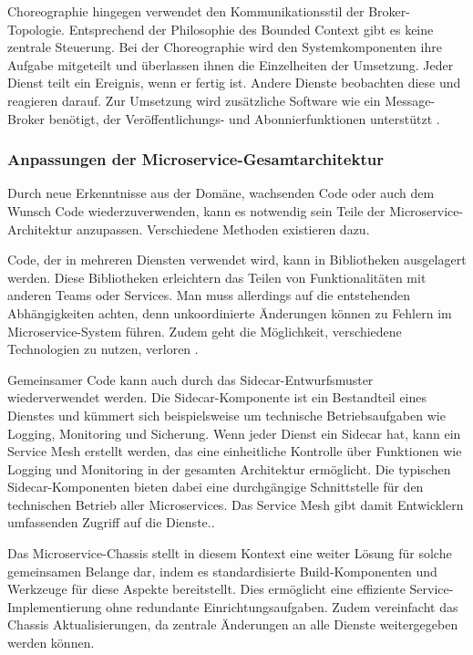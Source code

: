 {Choreographie hingegen verwendet den Kommunikationsstil der Broker-Topologie. Entsprechend der Philosophie des Bounded Context gibt es keine zentrale Steuerung. Bei der Choreographie wird den Systemkomponenten ihre Aufgabe mitgeteilt und überlassen ihnen die Einzelheiten der Umsetzung. Jeder Dienst teilt ein Ereignis, wenn er fertig ist. Andere Dienste beobachten diese und reagieren darauf. Zur Umsetzung wird zusätzliche Software wie ein Message-Broker benötigt, der Veröffentlichungs- und Abonnierfunktionen unterstützt \cite[S.72]{newman} \cite[S.261-262,264-265]{richards} \cite[S.168-169]{sommerville}.

\subsubsection{Anpassungen der Microservice-Gesamtarchitektur}

Durch neue Erkenntnisse aus der Domäne, wachsenden Code oder auch dem Wunsch Code wiederzuverwenden, kann es notwendig sein Teile der Microservice-Architektur anzupassen. Verschiedene Methoden existieren dazu.

Code, der in mehreren Diensten verwendet wird, kann in Bibliotheken ausgelagert werden. Diese Bibliotheken erleichtern das Teilen von Funktionalitäten mit anderen Teams oder Services. Man muss allerdings auf die entstehenden Abhängigkeiten achten, denn unkoordinierte Änderungen können zu Fehlern im Microservice-System führen. Zudem geht die Möglichkeit, verschiedene Technologien zu nutzen, verloren \cite[S. 1121-115]{wolff} \cite[S.31]{newman}.

Gemeinsamer Code kann auch durch das Sidecar-Entwurfsmuster wiederverwendet werden. Die Sidecar-Komponente ist ein Bestandteil eines Dienstes und kümmert sich beispielsweise um technische Betriebsaufgaben wie Logging, Monitoring und Sicherung. Wenn jeder Dienst ein Sidecar hat, kann ein Service Mesh erstellt werden, das eine einheitliche Kontrolle über Funktionen wie Logging und Monitoring in der gesamten Architektur ermöglicht. Die typischen Sidecar-Komponenten bieten dabei eine durchgängige Schnittstelle für den technischen Betrieb aller Microservices. Das Service Mesh gibt damit Entwicklern umfassenden Zugriff auf die Dienste.\cite[S.256-258]{richards}.

Das Microservice-Chassis stellt in diesem Kontext eine weiter Lösung für solche gemeinsamen Belange dar, indem es standardisierte Build-Komponenten und Werkzeuge für diese Aspekte bereitstellt. Dies ermöglicht eine effiziente Service-Implementierung ohne redundante Einrichtungsaufgaben. Zudem vereinfacht das Chassis Aktualisierungen, da zentrale Änderungen an alle Dienste weitergegeben werden können.
\cite{richardson}

}
